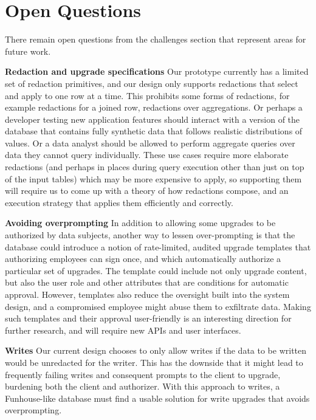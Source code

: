 \section{Open Questions}
\label{s:open}

There remain open questions from the challenges section that represent areas 
for future work.

\textbf{Redaction and upgrade specifications}
% 
Our prototype
currently has a limited set of redaction primitives, and our design only supports
redactions that select and apply to one row at a time. This prohibits some
forms of redactions, for example redactions for a joined row, redactions over aggregations.
Or perhaps a developer testing new application features should interact with a
version of the database that contains fully synthetic data that follows
realistic distributions of values. Or a
data analyst should be allowed to perform aggregate queries over data they
cannot query individually. These use cases require more
elaborate redactions (and perhaps in places during query execution other than
just on top of the input tables) which may be more expensive to apply, so
supporting them will require us to come up with a theory of how redactions
compose, and an execution strategy that applies them efficiently and correctly.

\textbf{Avoiding overprompting}
% 
In addition to allowing some upgrades to be authorized by data subjects, 
another way to lessen over-prompting is that the database could introduce a notion of rate-limited,
audited upgrade templates that authorizing employees can sign once, and which automatically
authorize a particular set of upgrades.
The template could include not only upgrade content, but also the user role and
other attributes that are conditions for automatic approval. However, templates also reduce 
the oversight built into the system design, and a compromised employee might abuse them to exfiltrate data.
Making such templates and their approval user-friendly is an interesting direction for further research,
and will require new APIs and user interfaces.

\textbf{Writes}
% 
Our current design chooses to only allow writes if the data to be written
would be unredacted for the writer. This has the downside that it might 
lead to frequently failing writes and consequent prompts to
the client to upgrade, burdening both the client and authorizer. With this
approach to writes, a Funhouse-like database must find a usable solution for
write upgrades that avoids overprompting.

